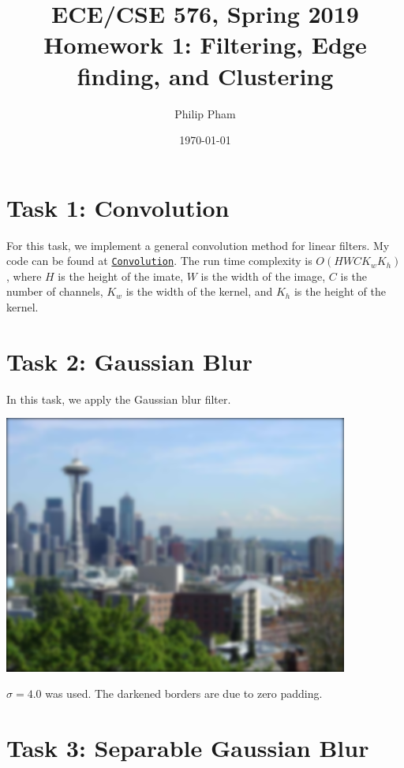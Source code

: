 \documentclass[letterpaper]{article}
\author{Philip Pham}
\title{ECE/CSE 576, Spring 2019 Homework 1: Filtering, Edge finding, and Clustering}
\date{\today}
\begin{document}
\maketitle

\section*{Task 1: Convolution}

For this task, we implement a general convolution method for linear filters. My
code can be found at
\href{https://github.com/ppham27/cse576/blob/master/hw1/Code/Project1.cpp\#L216}{\texttt{Convolution}}. The
run time complexity is $O\left(HWCK_wK_h\right)$, where $H$ is the height of the
imate, $W$ is the width of the image, $C$ is the number of channels, $K_w$ is
the width of the kernel, and $K_h$ is the height of the kernel.

\section*{Task 2: Gaussian Blur}

In this task, we apply the Gaussian blur filter.

\begin{center}
\includegraphics[width=0.85\textwidth]{task2.png}
\end{center}

$\sigma = 4.0$ was used. The darkened borders are due to zero padding.

\section*{Task 3: Separable Gaussian Blur}
\end{document}
